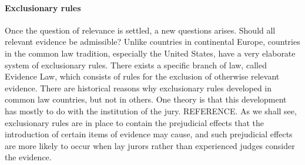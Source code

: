 \documentclass[10pt]{article}
\begin{document}









\paragraph{Exclusionary rules} 
Once the question of relevance is settled, a new questions arises. Should all relevant 
evidence be admissible? Unlike countries in continental Europe, countries in the common law tradition, especially the United States, have a very elaborate system of exclusionary rules. There exists a specific branch of law, called Evidence Law, which consists of rules for the exclusion of otherwise relevant evidence.  There are historical reasons why exclusionary rules developed in common law countries, but not in others. One theory is that this development has mostly to do with the institution of the jury. REFERENCE. 
As we shall see, exclusionary rules are in place to contain the prejudicial effects that the introduction of certain items of evidence may cause, 
and such prejudicial effects are more likely to occur when lay jurors rather than experienced judges consider the evidence. 
\end{document}
